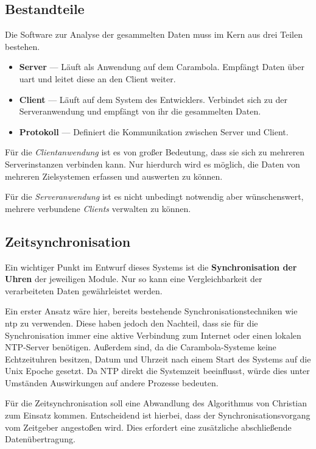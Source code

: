 \subsection{Bestandteile}\label{subs:best}
\begin{minipage}[c]{\textwidth}
Die Software zur Analyse der gesammelten Daten muss im Kern aus drei Teilen
bestehen.
\begin{itemize}
  \item \textbf{Server} --- Läuft als Anwendung auf dem Carambola. Empfängt
  Daten über \gls{uart} und leitet diese an den Client weiter.
  \item \textbf{Client} --- Läuft auf dem System des Entwicklers. Verbindet sich
  zu der Serveranwendung und empfängt von ihr die gesammelten Daten.
  \item \textbf{Protokoll} --- Definiert die Kommunikation zwischen Server und
  Client.
\end{itemize}
\end{minipage}
Für die \emph{Clientanwendung} ist es von großer Bedeutung, dass sie sich zu
mehreren Serverinstanzen verbinden kann. Nur hierdurch wird es möglich, die
Daten von mehreren Zielsystemen erfassen und auswerten zu können.

Für die \emph{Serveranwendung} ist es nicht unbedingt notwendig aber
wünschenswert, mehrere verbundene \emph{Clients} verwalten zu können.
\subsection{Zeitsynchronisation}\label{subs:time}
Ein wichtiger Punkt im Entwurf dieses Systems ist die \textbf{Synchronisation
der Uhren} der jeweiligen Module. Nur so kann eine Vergleichbarkeit der
verarbeiteten Daten gewährleistet werden.

Ein erster Ansatz wäre hier, bereits bestehende Synchronisationstechniken wie
\gls{ntp} zu verwenden. Diese haben jedoch den Nachteil, dass sie für die
Synchronisation immer eine aktive Verbindung zum Internet oder einen lokalen
NTP-Server  benötigen. Außerdem sind, da die Carambola-Systeme keine
Echtzeituhren besitzen, Datum und Uhrzeit nach einem Start des Systems auf die
Unix Epoche gesetzt. Da NTP direkt die Systemzeit beeinflusst, würde dies 
unter Umständen Auswirkungen auf andere Prozesse bedeuten.

Für die Zeitsynchronisation soll eine Abwandlung des Algorithmus von
Christian\cite{CHR} zum Einsatz kommen. Entscheidend ist hierbei, dass der
Synchronisationsvorgang vom Zeitgeber angestoßen wird. Dies erfordert eine zusätzliche
abschließende Datenübertragung.

